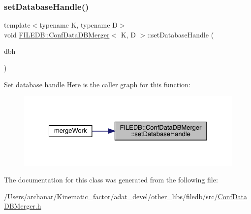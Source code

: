 \subsubsection{\texorpdfstring{setDatabaseHandle()}{setDatabaseHandle()}\hspace{0.1cm}{\footnotesize\ttfamily [2/2]}}
{\footnotesize\ttfamily template$<$typename K, typename D$>$ \\
void \mbox{\hyperlink{classFILEDB_1_1ConfDataDBMerger}{F\+I\+L\+E\+D\+B\+::\+Conf\+Data\+D\+B\+Merger}}$<$ K, D $>$\+::set\+Database\+Handle (\begin{DoxyParamCaption}\item[{\mbox{\hyperlink{classFILEDB_1_1AllConfStoreDB}{All\+Conf\+Store\+DB}}$<$ K, D $>$ $\ast$}]{dbh }\end{DoxyParamCaption})\hspace{0.3cm}{\ttfamily [inline]}}

Set database handle Here is the caller graph for this function\+:\nopagebreak
\begin{figure}[H]
\begin{center}
\leavevmode
\includegraphics[width=328pt]{db/d60/classFILEDB_1_1ConfDataDBMerger_aba7a50569bcdc1beca3b82536fa5922b_icgraph}
\end{center}
\end{figure}


The documentation for this class was generated from the following file\+:\begin{DoxyCompactItemize}
\item 
/\+Users/archanar/\+Kinematic\+\_\+factor/adat\+\_\+devel/other\+\_\+libs/filedb/src/\mbox{\hyperlink{other__libs_2filedb_2src_2ConfDataDBMerger_8h}{Conf\+Data\+D\+B\+Merger.\+h}}\end{DoxyCompactItemize}
